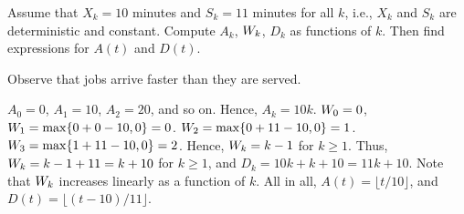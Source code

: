 \begin{exercise}\label{ex:25}
  Assume that $X_k = 10$ minutes and $S_k = 11$ minutes for all $k$, i.e., $X_k$ and $S_k$ are deterministic and constant.
 Compute $A_k$, $W_k$, $D_k$ as functions of $k$.
  Then find expressions for $A(t)$ and $D(t)$.
\begin{hint}
Observe that jobs arrive faster than they are served.
\end{hint}
\begin{solution}
$A_0 = 0$, $A_1=10$, $A_2=20$, and so on. Hence,
 $A_k = 10k$. $W_{0} = 0$, $W_{1} = \max\{0 + 0-10,0\} = 0$.
 $W_{2} = \max\{0+11-10,0\} =1$.
 $W_{3} = \max\{1+11-10,0\} =2$. Hence, $W_{k} = k-1$ for
 $k\geq1$. Thus, $W_k = k-1+11 = k + 10$ for $k\geq1$, and
 $D_k = 10k + k+10 = 11k+10$. Note that $W_k$ increases linearly
 as a function of $k$. All in all, $A(t) = \lfloor t/10\rfloor$, and $D(t) = \lfloor (t-10)/11 \rfloor$.
\end{solution}
\end{exercise}


